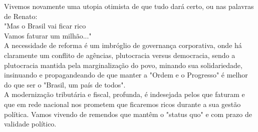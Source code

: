 \documentclass[12pt,a4paper]{article}
\begin{document}
Vivemos novamente uma utopia otimista de que tudo dará certo, ou nas palavras de Renato:\\ "Mas o Brasil vai ficar rico\\
 Vamos faturar um milhão..."\\
A necessidade de reforma é um imbróglio de governança corporativa, onde há claramente um conflito de agências, plutocracia versus democracia, sendo a plutocracia mantida pela marginalização do povo, minando sua solidariedade, insinuando e propagandeando de que manter a "Ordem e o Progresso" é melhor do que ser o "Brasil, um país de todos".\\
A modernização tributária e fiscal, profunda, é indesejada pelos que faturam e que em rede nacional nos prometem que ficaremos ricos durante a sua gestão política. Vamos vivendo de remendos que mantêm o "status quo" e com prazo de validade político.
\end{document}
